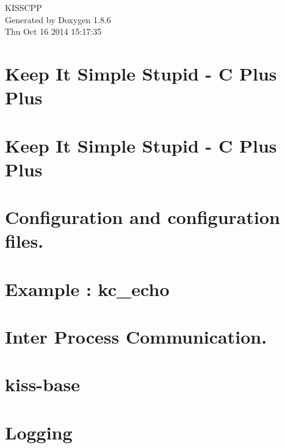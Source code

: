 \documentclass[twoside]{book}
\newcommand{\clearemptydoublepage}{%
  \newpage{\pagestyle{empty}\cleardoublepage}%
}
\begin{document}
\hypersetup{pageanchor=false}
\begin{titlepage}
\vspace*{7cm}
\begin{center}%
{\Large K\-I\-S\-S\-C\-P\-P }\\
\vspace*{1cm}
{\large Generated by Doxygen 1.8.6}\\
\vspace*{0.5cm}
{\small Thu Oct 16 2014 15:17:35}\\
\end{center}
\end{titlepage}
\clearemptydoublepage
\tableofcontents
\clearemptydoublepage
{}
\hypersetup{pageanchor=true}

\chapter{Keep It Simple Stupid -\/ C Plus Plus}
\label{index}\hypertarget{index}{}
\chapter{Keep It Simple Stupid -\/ C Plus Plus}
\label{md__r_e_a_d_m_e}
\hypertarget{md__r_e_a_d_m_e}{}

\chapter{Configuration and configuration files.}
\label{md_configuration}
\hypertarget{md_configuration}{}

\chapter{Example \-: kc\-\_\-echo}
\label{md_example_echo}
\hypertarget{md_example_echo}{}

\chapter{Inter Process Communication.}
\label{md_inter_process_communication}
\hypertarget{md_inter_process_communication}{}

\chapter{kiss-\/base}
\label{md_kiss-base}
\hypertarget{md_kiss-base}{}

\chapter{Logging}
\label{md_logging}
\hypertarget{md_logging}{}

\end{document}

